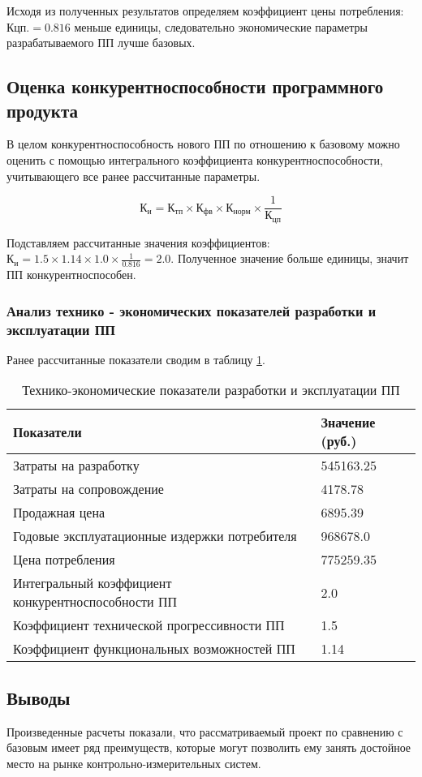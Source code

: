 Исходя из полученных результатов определяем коэффициент цены потребления: $Кцп.=0.816$ меньше единицы,
следовательно экономические параметры разрабатываемого ПП лучше базовых.

\subsection{Оценка конкурентноспособности программного продукта}
В целом конкурентноспособность нового ПП по отношению к базовому можно оценить с помощью интегрального
коэффициента конкурентноспособности, учитывающего все ранее рассчитанные параметры.

\begin{equation}
К_{и} = К_{тп} \times{} К_{фв} \times{} К_{норм} \times{} \frac{1}{К_{цп}}
\end{equation}

Подставляем рассчитанные значения коэффициентов: $К_{и} = 1.5 \times{} 1.14 \times{} 1.0 \times{} \frac{1}{0.816} = 2.0$.
Полученное значение больше единицы, значит ПП конкурентноспособен.

\subsubsection{Анализ технико - экономических показателей разработки и эксплуатации ПП}
Ранее рассчитанные показатели сводим в таблицу \ref{table:eksplPP}.
\begin{table}[H]
\caption{Технико-экономические показатели разработки и эксплуатации  ПП}
\begin{tabular}{|p{12cm}|p{4.2cm}|}
\hline{}
Показатели & Значение (руб.) \\
\hline{}
Затраты на разработку & 545163.25 \\
\hline{}
Затраты на сопровождение & 4178.78 \\
\hline{}
Продажная цена & 6895.39 \\
\hline{}
Годовые эксплуатационные издержки потребителя & 968678.0 \\
\hline{}
Цена потребления & 775259.35 \\
\hline{}
Интегральный коэффициент   конкурентноспособности ПП & 2.0 \\
\hline{}
Коэффициент технической прогрессивности ПП & 1.5 \\
\hline{}
Коэффициент функциональных возможностей ПП & 1.14 \\
\hline
\end{tabular}
\label{table:eksplPP}
\end{table}

\subsection{Выводы}
Произведенные расчеты показали, что рассматриваемый проект по сравнению с базовым имеет ряд преимуществ,
которые могут позволить ему занять достойное место на рынке контрольно-измерительных систем.
\newpage{}
